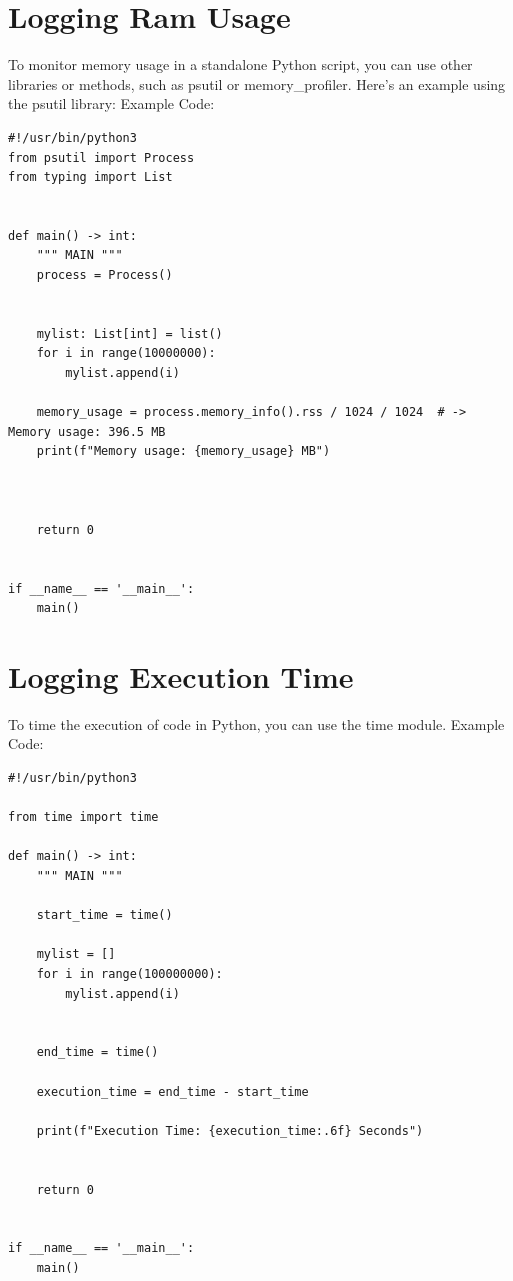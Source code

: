 \documentclass{report}
\begin{document}
    \pagebreak \bigbreak \noindent
    \section{Logging Ram Usage}
    \bigbreak \noindent 
    To monitor memory usage in a standalone Python script, you can use other libraries or methods, such as psutil or memory\_profiler. Here's an example using the psutil library:
    \bigbreak \noindent 
    Example Code:
    \begin{verbatim}
#!/usr/bin/python3
from psutil import Process
from typing import List


def main() -> int:
    """ MAIN """
    process = Process()


    mylist: List[int] = list()
    for i in range(10000000):
        mylist.append(i)

    memory_usage = process.memory_info().rss / 1024 / 1024  # -> Memory usage: 396.5 MB
    print(f"Memory usage: {memory_usage} MB")
    
    

    return 0


if __name__ == '__main__':
    main()
    \end{verbatim}

    \pagebreak \bigbreak \noindent
    \section{Logging Execution Time}
    \bigbreak \noindent 
    To time the execution of code in Python, you can use the time module.
    \bigbreak \noindent 
    Example Code:
    \begin{verbatim}
#!/usr/bin/python3

from time import time

def main() -> int:
    """ MAIN """

    start_time = time()

    mylist = []
    for i in range(100000000):
        mylist.append(i)


    end_time = time()

    execution_time = end_time - start_time
    
    print(f"Execution Time: {execution_time:.6f} Seconds")
    

    return 0


if __name__ == '__main__':
    main()
    \end{verbatim}
\end{document}
